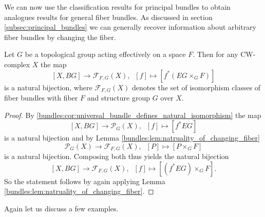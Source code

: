 We can now use the classification results for principal bundles to obtain analogues results for general fiber bundles. As discussed in section \ref{subsec:principal_bundles} we can generally recover information about arbitrary fiber bundles by changing the fiber.

\begin{corollary}
    \label{bundles:cor:universal_fiber_bundles}
    Let $G$ be a topological group acting effectively on a space $F$. Then for any CW-complex $X$ the map 
    \[
    [X,BG] \to \mathcal{F}_{F,G}(X), \; \; [f] \mapsto \left[f^\ast(EG \times_G F)\right]
    \]
    is a natural bijection, where $\mathcal{F}_{F,G}(X)$ denotes the set of isomorphism classes of fiber bundles with fiber $F$ and structure group $G$ over $X$.
\end{corollary}

\begin{proof}
    By \ref{bundles:cor:universal_bundle_defines_natural_isomorphism} the map 
    \[
    [X,BG] \to \mathcal{P}_G(X), \; \; [f] \mapsto [f^\ast EG]
    \]
    is a natural bijection and by Lemma \ref{bundles:lem:natruality_of_changing_fiber}
    \[
    \mathcal{P}_G(X) \to \mathcal{F}_{F,G}(X), \; \; [P] \mapsto \left[P \times_G F\right]
    \]
    is a natural bijection. Composing both thus yields the natural bijection 
    \[
    [X,BG] \to \mathcal{F}_{F,G}(X), \; \; [f] \mapsto \left[(f^\ast EG) \times_G F\right].
    \]
    So the statement follows by again applying Lemma \ref{bundles:lem:natruality_of_changing_fiber}.
\end{proof}

Again let us discuss a few examples.

